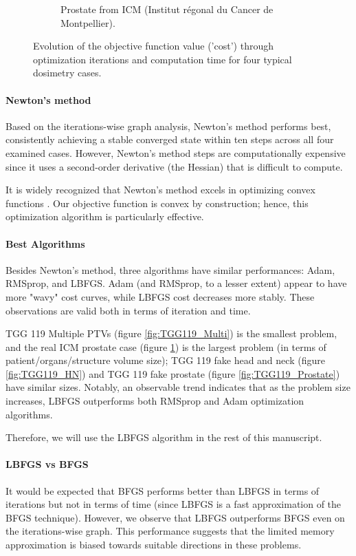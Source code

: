 \begin{figure}
\begin{subfigure}{\textwidth}
		\caption{Prostate from ICM (Institut régonal du Cancer de Montpellier).}
		\label{fig:ICM_Prostate}
	\end{subfigure}
	\caption{Evolution of the objective function value ('cost') through optimization iterations and computation time for four typical dosimetry cases.}
	\label{fig:OptimizersComparison}
\end{figure}

\paragraph{Newton's method}
Based on the iterations-wise graph analysis, Newton's method performs best, consistently achieving a stable converged state within ten steps across all four examined cases.
However, Newton's method steps are computationally expensive since it uses a second-order derivative (the Hessian) that is difficult to compute.

It is widely recognized that Newton's method excels in optimizing convex functions \cite{PoczosTibshirani2013}.
Our objective function is convex by construction; hence, this optimization algorithm is particularly effective.

\paragraph{Best Algorithms}
Besides Newton's method, three algorithms have similar performances: Adam, RMSprop, and LBFGS.
Adam (and RMSprop, to a lesser extent) appear to have more "wavy" cost curves, while LBFGS cost decreases more stably.
These observations are valid both in terms of iteration and time.

TGG 119 Multiple PTVs (figure \ref{fig:TGG119_Multi}) is the smallest problem, and the real ICM prostate case (figure \ref{fig:ICM_Prostate}) is the largest problem (in terms of patient/organs/structure volume size);
TGG 119 fake head and neck (figure \ref{fig:TGG119_HN}) and TGG 119 fake prostate (figure \ref{fig:TGG119_Prostate}) have similar sizes.
Notably, an observable trend indicates that as the problem size increases, LBFGS outperforms both RMSprop and Adam optimization algorithms.

Therefore, we will use the LBFGS algorithm in the rest of this manuscript.

\paragraph{LBFGS vs BFGS}
It would be expected that BFGS performs better than LBFGS in terms of iterations but not in terms of time (since LBFGS is a fast approximation of the BFGS technique).
However, we observe that LBFGS outperforms BFGS even on the iterations-wise graph.
This performance suggests that the limited memory approximation is biased towards suitable directions in these problems.

